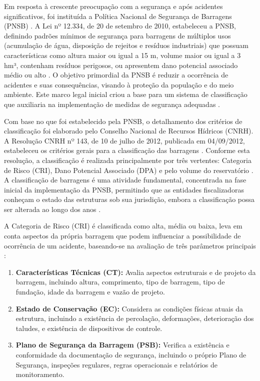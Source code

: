 Em resposta à crescente preocupação com a segurança e após acidentes significativos, foi instituída a Política Nacional de Segurança de Barragens (\textsc{PNSB}) \cite{cnrh2012,moecke2019}. A Lei nº 12.334, de 20 de setembro de 2010, estabeleceu a \textsc{PNSB}, definindo padrões mínimos de segurança para barragens de múltiplos usos (acumulação de água, disposição de rejeitos e resíduos industriais) que possuam características como altura maior ou igual a 15 m, volume maior ou igual a 3 hm³, contenham resíduos perigosos, ou apresentem dano potencial associado médio ou alto \cite{carvalho2018,moecke2019}. O objetivo primordial da \textsc{PNSB} é reduzir a ocorrência de acidentes e suas consequências, visando à proteção da população e do meio ambiente. Este marco legal inicial criou a base para um sistema de classificação que auxiliaria na implementação de medidas de segurança adequadas \cite{moecke2019}.

Com base no que foi estabelecido pela \textsc{PNSB}, o detalhamento dos critérios de classificação foi elaborado pelo Conselho Nacional de Recursos Hídricos (\textsc{CNRH}). A Resolução \textsc{CNRH} nº 143, de 10 de julho de 2012, publicada em 04/09/2012, estabeleceu os critérios gerais para a classificação das barragens \cite{cnrh2012}. Conforme esta resolução, a classificação é realizada principalmente por três vertentes: Categoria de Risco (\textsc{CRI}), Dano Potencial Associado (\textsc{DPA}) e pelo volume do reservatório \cite{cnrh2012,moecke2019}. A classificação de barragens é uma atividade fundamental, concentrada na fase inicial da implementação da \textsc{PNSB}, permitindo que as entidades fiscalizadoras conheçam o estado das estruturas sob sua jurisdição, embora a classificação possa ser alterada ao longo dos anos \cite{moecke2019}.

A Categoria de Risco (\textsc{CRI}) é classificada como alta, média ou baixa, leva em conta aspectos da própria barragem que podem influenciar a possibilidade de ocorrência de um acidente, baseando-se na avaliação de três parâmetros principais \cite{cnrh2012,geoscan2020}:

\begin{enumerate}
    \item \textbf{Características Técnicas (CT):} Avalia aspectos estruturais e de projeto da barragem, incluindo altura, comprimento, tipo de barragem, tipo de fundação, idade da barragem e vazão de projeto.
    \item \textbf{Estado de Conservação (EC):} Considera as condições físicas atuais da estrutura, incluindo a existência de percolação, deformações, deterioração dos taludes, e existência de dispositivos de controle.
    \item \textbf{Plano de Segurança da Barragem (PSB):} Verifica a existência e conformidade da documentação de segurança, incluindo o próprio Plano de Segurança, inspeções regulares, regras operacionais e relatórios de monitoramento.
\end{enumerate}

